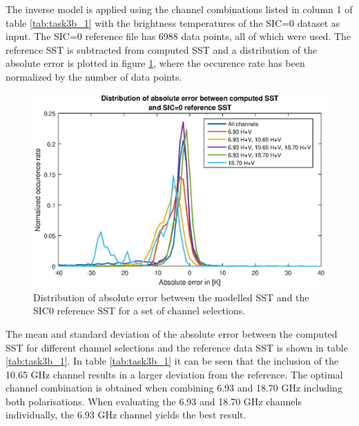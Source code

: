 \documentclass[11pt, a4paper]{article}
\begin{document}
The inverse model is applied using the channel combinations listed in column 1 of table \ref{tab:task3b_1} with the brightness temperatures of the SIC=0 dataset as input. The SIC=0 reference file has 6988 data points, all of which were used. The reference SST is subtracted from computed SST and a distribution of the absolute error is plotted in figure \ref{fig:task3b}, where the occurence rate has been normalized by the number of data points.  
\newline 

\begin{figure}[h]
	\centering
	\includegraphics[width=1.0\textwidth]{task3b.eps}
	\caption{Distribution of absolute error between the modelled SST and the SIC0 reference SST for a set of channel selections.}
	\label{fig:task3b}
\end{figure}

The mean and standard deviation of the absolute error between the computed SST for different channel selections and the reference data SST is shown in table \ref{tab:task3b_1}. In table \ref{tab:task3b_1} it can be seen that the inclusion of the 10.65 GHz channel results in a larger deviation from the reference. The optimal channel combination is obtained when combining 6.93 and 18.70 GHz including both polarisations. When evaluating the 6.93 and 18.70 GHz channels individually, the 6.93 GHz channel yields the best result.
\newline 
\end{document}
